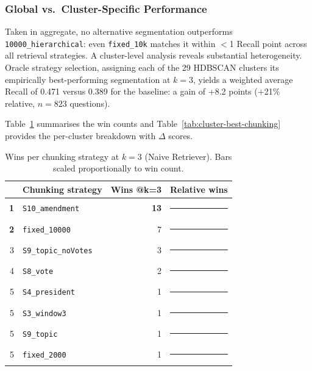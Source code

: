 \subsubsection{Global vs.\ Cluster-Specific Performance}
\label{sec:indexing-global}

Taken in aggregate, no alternative segmentation outperforms \texttt{10000\_hierarchical}:
even \texttt{fixed\_10k} matches it within $<$1 Recall point across all retrieval strategies.
A cluster-level analysis reveals substantial heterogeneity.
Oracle strategy selection, assigning each of the 29 HDBSCAN clusters its
empirically best-performing segmentation at $k{=}3$, yields a weighted average Recall of 0.471 versus 0.389 for the baseline:
a gain of +8.2 points ($+$21\% relative, $n{=}823$ questions).

Table~\ref{tab:chunking-wins-k3} summarises the win counts and
Table~\ref{tab:cluster-best-chunking} provides the per-cluster breakdown
with $\Delta$ scores.

\renewcommand{\arraystretch}{0.92}
\begin{table}[htbp]
\centering
\scriptsize
\begin{tabular}{r l r l}
\toprule
 & \textbf{Chunking strategy} & \textbf{Wins @k=3} & \textbf{Relative wins} \\
\midrule
\textbf{1} & \texttt{S10\_amendment}      & \textbf{13} & \rule{52pt}{5pt} \\
\textbf{2} & \texttt{fixed\_10000}        &  7          & \rule{28pt}{5pt} \\
3          & \texttt{S9\_topic\_noVotes}   &  3          & \rule{12pt}{5pt} \\
4          & \texttt{S8\_vote}             &  2          & \rule{8pt}{5pt}  \\
5          & \texttt{S4\_president}        &  1          & \rule{4pt}{5pt}  \\
5          & \texttt{S3\_window3}          &  1          & \rule{4pt}{5pt}  \\
5          & \texttt{S9\_topic}            &  1          & \rule{4pt}{5pt}  \\
5          & \texttt{fixed\_2000}          &  1          & \rule{4pt}{5pt}  \\
\bottomrule
\end{tabular}
\caption{Wins per chunking strategy at $k=3$ (Naive Retriever).
Bars scaled proportionally to win count.}
\label{tab:chunking-wins-k3}
\end{table}

